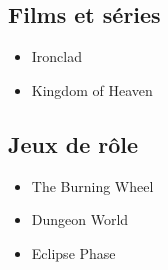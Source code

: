 \documentclass[10pt,a4paper,twocolumn]{book}
\begin{document}
\subsection*{Films et séries}
\begin{itemize}
\item Ironclad
\item Kingdom of Heaven
\end{itemize}
\subsection*{Jeux de rôle}
\begin{itemize}
\item The Burning Wheel
\item Dungeon World
\item Eclipse Phase
\end{itemize}
\tableofcontents
\end{document}
